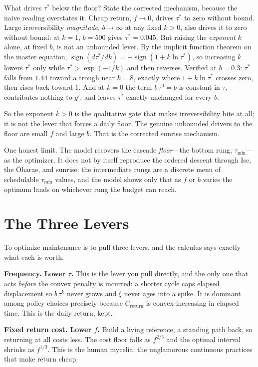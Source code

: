 \documentclass[12pt]{article}
\begin{document}
What drives $\tau^*$ below the floor? State the corrected mechanism, because the naive reading overstates it. Cheap return, $f\to 0$, drives $\tau^*$ to zero without bound. Large irreversibility \emph{magnitude}, $b\to\infty$ at any fixed $k>0$, also drives it to zero without bound: at $k=1$, $b=500$ gives $\tau^*=0.045$. But raising the \emph{exponent} $k$ alone, at fixed $b$, is not an unbounded lever. By the implicit function theorem on the master equation, $\operatorname{sign}(d\tau^*/dk)=-\operatorname{sign}(1+k\ln\tau^*)$, so increasing $k$ lowers $\tau^*$ only while $\tau^*>\exp(-1/k)$ and then reverses. Verified at $b=0.3$: $\tau^*$ falls from $1.44$ toward a trough near $k=8$, exactly where $1+k\ln\tau^*$ crosses zero, then rises back toward $1$. And at $k=0$ the term $b\,\tau^0=b$ is constant in $\tau$, contributes nothing to $g'$, and leaves $\tau^*$ exactly unchanged for every $b$.

So the exponent $k>0$ is the qualitative gate that makes irreversibility bite at all; it is not the lever that forces a daily floor. The genuine unbounded drivers to the floor are small $f$ and large $b$. That is the corrected sunrise mechanism.

One honest limit. The model recovers the cascade \emph{floor}---the bottom rung, $\tau_{\min}$---as the optimizer. It does not by itself reproduce the ordered descent through Ise, the Ōharae, and sunrise; the intermediate rungs are a discrete menu of schedulable $\tau_{\min}$ values, and the model shows only that as $f$ or $b$ varies the optimum lands on whichever rung the budget can reach.

\section{The Three Levers}

To optimize maintenance is to pull three levers, and the calculus says exactly what each is worth.

\textbf{Frequency. Lower $\tau$.} This is the lever you pull directly, and the only one that acts \emph{before} the convex penalty is incurred: a shorter cycle caps elapsed displacement so $b\,\tau^k$ never grows and $\xi$ never ages into a spike. It is dominant among policy choices precisely because $C_{\text{return}}$ is convex-increasing in elapsed time. This is the daily return, kept.

\textbf{Fixed return cost. Lower $f$.} Build a living reference, a standing path back, so returning at all costs less. The cost floor falls as $f^{2/3}$ and the optimal interval shrinks as $f^{1/3}$. This is the human mycelia: the unglamorous continuous practices that make return cheap.
\end{document}
